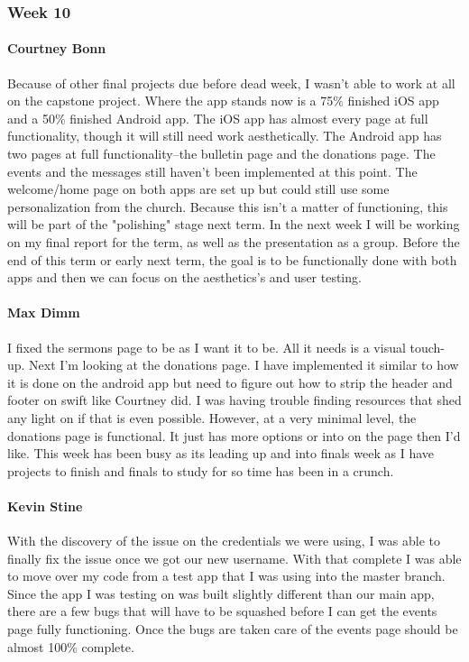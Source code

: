 			
		\subsubsection{Week 10}
		
			\paragraph{Courtney Bonn}
			Because of other final projects due before dead week, I wasn't able to work at all on the capstone project. Where the app stands now is a 75\% finished iOS app and a 50\% finished Android app. The iOS app has almost every page at full functionality, though it will still need work aesthetically. The Android app has two pages at full functionality--the bulletin page and the donations page. The events and the messages still haven't been implemented at this point. The welcome/home page on both apps are set up but could still use some personalization from the church. Because this isn't a matter of functioning, this will be part of the "polishing" stage next term. In the next week I will be working on my final report for the term, as well as the presentation as a group. Before the end of this term or early next term, the goal is to be functionally done with both apps and then we can focus on the aesthetics's and user testing.

			\paragraph{Max Dimm}
			I fixed the sermons page to be as I want it to be. All it needs is a visual touch-up. Next I'm looking at the donations page. I have implemented it similar to how it is done on the android app but need to figure out how to strip the header and footer on swift like Courtney did. I was having trouble finding resources that shed any light on if that is even possible. However, at a very minimal level, the donations page is functional. It just has more options or into on the page then I'd like. This week has been busy as its leading up and into finals week as I have projects to finish and finals to study for so time has been in a crunch.
			
			\paragraph{Kevin Stine}
			With the discovery of the issue on the credentials we were using, I was able to finally fix the issue once we got our new username. With that complete I was able to move over my code from a test app that I was using into the master branch. Since the app I was testing on was built slightly different than our main app, there are a few bugs that will have to be squashed before I can get the events page fully functioning. Once the bugs are taken care of the events page should be almost 100\% complete.
			
